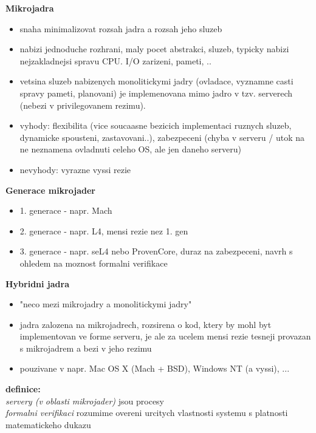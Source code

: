 \documentclass[a4paper, 11pt]{article}
\begin{document}
\noindent\textbf{Mikrojadra}
\begin{itemize}
    \item snaha minimalizovat rozsah jadra a rozsah jeho sluzeb
    \item nabizi jednoduche rozhrani, maly pocet abstrakci, sluzeb, typicky nabizi nejzakladnejsi spravu CPU. I/O zarizeni, pameti, ..
    \item vetsina sluzeb nabizenych monolitickymi jadry (ovladace, vyznamne casti spravy pameti, planovani) je implemenovana mimo jadro v tzv. serverech (nebezi v privilegovanem rezimu).
    \item vyhody: flexibilita (vice soucaasne bezicich implementaci ruznych sluzeb, dynamicke spousteni, zastavovani..), zabezpeceni (chyba v serveru / utok na ne neznamena ovladnuti celeho OS, ale jen daneho serveru)
    \item nevyhody: vyrazne vyssi rezie \\
\end{itemize}

\noindent\textbf{Generace mikrojader}
\begin{itemize}
    \item 1. generace - napr. Mach
    \item 2. generace - napr. L4, mensi rezie nez 1. gen
    \item 3. generace - napr. seL4 nebo ProvenCore, duraz na zabezpeceni, navrh s ohledem na moznost formalni verifikace \\
\end{itemize}

\newpage

\noindent\textbf{Hybridni jadra}
\begin{itemize}
    \item "neco mezi mikrojadry a monolitickymi jadry"
    \item jadra zalozena na mikrojadrech, rozsirena o kod, ktery by mohl byt implementovan ve forme serveru, je ale za ucelem mensi rezie tesneji provazan s mikrojadrem a bezi v jeho rezimu
    \item pouzivane v napr. Mac OS X (Mach + BSD), Windows NT (a vyssi), ... \\
\end{itemize}

\noindent\textbf{definice:} \\[0.5em]
\textit{servery (v oblasti mikrojader)} jsou procesy \\[0.2em]
\textit{formalni verifikaci} rozumime overeni urcitych vlastnosti systemu s platnosti matematickeho dukazu \\[0.5em]
\end{document}
